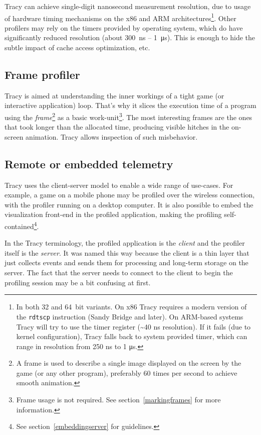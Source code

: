 \documentclass[hidelinks,titlepage,a4paper]{article}
\begin{document}
Tracy can achieve single-digit nanosecond measurement resolution, due to usage of hardware timing mechanisms on the x86 and ARM architectures\footnote{In both 32 and 64~bit variants. On x86 Tracy requires a modern version of the \texttt{rdtscp} instruction (Sandy Bridge and later). On ARM-based systems Tracy will try to use the timer register (\textasciitilde 40 \si{\nano\second} resolution). If it fails (due to kernel configuration), Tracy falls back to system provided timer, which can range in resolution from 250 \si{\nano\second} to 1 \si{\micro\second}.}. Other profilers may rely on the timers provided by operating system, which do have significantly reduced resolution (about 300~\si{\nano\second} -- 1~\si{\micro\second}). This is enough to hide the subtle impact of cache access optimization, etc.

\subsection{Frame profiler}

Tracy is aimed at understanding the inner workings of a tight game (or interactive application) loop. That's why it slices the execution time of a program using the \emph{frame}\footnote{A frame is used to describe a single image displayed on the screen by the game (or any other program), preferably 60 times per second to achieve smooth animation.} as a basic work-unit\footnote{Frame usage is not required. See section~\ref{markingframes} for more information.}. The most interesting frames are the ones that took longer than the allocated time, producing visible hitches in the on-screen animation. Tracy allows inspection of such misbehavior.

\subsection{Remote or embedded telemetry}

Tracy uses the client-server model to enable a wide range of use-cases. For example, a game on a mobile phone may be profiled over the wireless connection, with the profiler running on a desktop computer. It is also possible to embed the visualization front-end in the profiled application, making the profiling self-contained\footnote{See section~\ref{embeddingserver} for guidelines.}.

In the Tracy terminology, the profiled application is the \emph{client} and the profiler itself is the \emph{server}. It was named this way because the client is a thin layer that just collects events and sends them for processing and long-term storage on the server. The fact that the server needs to connect to the client to begin the profiling session may be a bit confusing at first.
\end{document}
